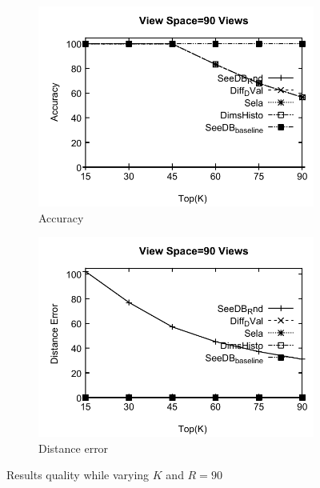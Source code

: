 \begin{figure}[t]
 \centering
  \begin{subfigure}[b]{0.42\textwidth}
    \includegraphics[width=\textwidth]{11.pdf}
    \caption{Accuracy}
       \label{fig:fig3}
  \end{subfigure}
  \begin{subfigure}[b]{0.42\textwidth}
    \includegraphics[width=\textwidth]{12.pdf}
     \caption{Distance error}
       \label{fig:fig4}%
  \end{subfigure}
  \caption{Results quality while varying $K$ and $R = 90$}
\end{figure}

